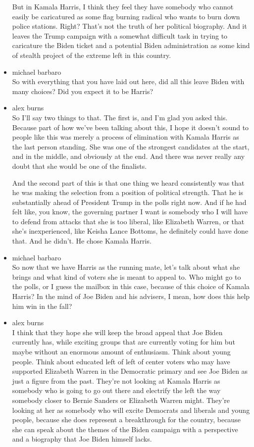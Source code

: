 \begin{itemize}
  But in Kamala Harris, I think they feel they have somebody who cannot
  easily be caricatured as some flag burning radical who wants to burn
  down police stations. Right? That's not the truth of her political
  biography. And it leaves the Trump campaign with a somewhat difficult
  task in trying to caricature the Biden ticket and a potential Biden
  administration as some kind of stealth project of the extreme left in
  this country.
\item
  michael barbaro\\
  So with everything that you have laid out here, did all this leave
  Biden with many choices? Did you expect it to be Harris?
\item
  alex burns\\
  So I'll say two things to that. The first is, and I'm glad you asked
  this. Because part of how we've been talking about this, I hope it
  doesn't sound to people like this was merely a process of elimination
  with Kamala Harris as the last person standing. She was one of the
  strongest candidates at the start, and in the middle, and obviously at
  the end. And there was never really any doubt that she would be one of
  the finalists.

  And the second part of this is that one thing we heard consistently
  was that he was making the selection from a position of political
  strength. That he is substantially ahead of President Trump in the
  polls right now. And if he had felt like, you know, the governing
  partner I want is somebody who I will have to defend from attacks that
  she is too liberal, like Elizabeth Warren, or that she's
  inexperienced, like Keisha Lance Bottoms, he definitely could have
  done that. And he didn't. He chose Kamala Harris.
\item
  michael barbaro\\
  So now that we have Harris as the running mate, let's talk about what
  she brings and what kind of voters she is meant to appeal to. Who
  might go to the polls, or I guess the mailbox in this case, because of
  this choice of Kamala Harris? In the mind of Joe Biden and his
  advisers, I mean, how does this help him win in the fall?
\item
  alex burns\\
  I think that they hope she will keep the broad appeal that Joe Biden
  currently has, while exciting groups that are currently voting for him
  but maybe without an enormous amount of enthusiasm. Think about young
  people. Think about educated left of left of center voters who may
  have supported Elizabeth Warren in the Democratic primary and see Joe
  Biden as just a figure from the past. They're not looking at Kamala
  Harris as somebody who is going to go out there and electrify the left
  the way somebody closer to Bernie Sanders or Elizabeth Warren might.
  They're looking at her as somebody who will excite Democrats and
  liberals and young people, because she does represent a breakthrough
  for the country, because she can speak about the themes of the Biden
  campaign with a perspective and a biography that Joe Biden himself
  lacks.


\end{itemize}
